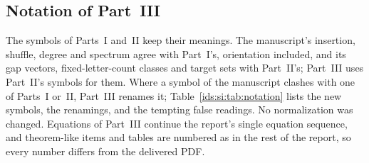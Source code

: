 \documentclass[11pt,letterpaper]{article}
\theoremstyle{definition}\newtheorem{definition}[theorem]{Definition}
\theoremstyle{remark}\newtheorem{remark}[theorem]{Remark}
\theoremstyle{definition}\newtheorem{question}[theorem]{Question}
\begin{document}
\subsection{Notation of Part~III}\label{ids:si:sec:notation}

The symbols of Parts~I and~II keep their meanings. The manuscript's insertion,
shuffle, degree and spectrum agree with Part~I's, orientation included, and
its gap vectors, fixed-letter-count classes and target sets with Part~II's;
Part~III uses Part~II's symbols for them. Where a symbol of the manuscript
clashes with one of Parts~I or~II, Part~III renames it;
Table~\ref{ids:si:tab:notation} lists the new symbols, the renamings, and the
tempting false readings. No normalization was changed. Equations of Part~III
continue the report's single equation sequence, and theorem-like items and
tables are numbered as in the rest of the report, so every number differs from
the delivered PDF.
\end{document}
